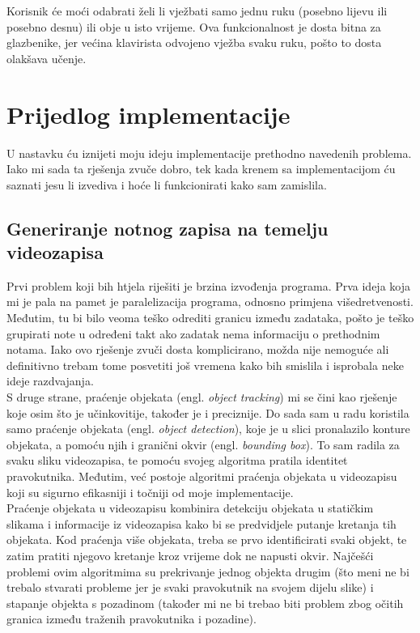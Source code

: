 \documentclass[times, utf8, seminar, numeric]{fer}
\begin{document}
Korisnik će moći odabrati želi li vježbati samo jednu ruku (posebno lijevu ili posebno desnu) ili obje u isto vrijeme. Ova funkcionalnost je dosta bitna za glazbenike, jer većina klavirista odvojeno vježba svaku ruku, pošto to dosta olakšava učenje.
 
\chapter{Prijedlog implementacije}
U nastavku ću iznijeti moju ideju implementacije prethodno navedenih problema. Iako mi sada ta rješenja zvuče dobro, tek kada krenem sa implementacijom ću saznati jesu li izvediva i hoće li funkcionirati kako sam zamislila.

\section{Generiranje notnog zapisa na temelju videozapisa}
Prvi problem koji bih htjela riješiti je brzina izvođenja programa. Prva ideja koja mi je pala na pamet je paralelizacija programa, odnosno primjena višedretvenosti. Međutim, tu bi bilo veoma teško odrediti granicu između zadataka, pošto je teško grupirati note u određeni takt ako zadatak nema informaciju o prethodnim notama. Iako ovo rješenje zvuči dosta komplicirano, možda nije nemoguće ali definitivno trebam tome posvetiti još vremena kako bih smislila i isprobala neke ideje razdvajanja.\\

S druge strane, praćenje objekata (engl. \textit{object tracking}\cite{tracking1}) mi se čini kao rješenje koje osim što je učinkovitije, također je i preciznije. Do sada sam u radu koristila samo praćenje objekata (engl. \textit{object detection}\cite{tracking2}), koje je u slici pronalazilo konture objekata, a pomoću njih i granični okvir (engl. \textit{bounding box}). To sam radila za svaku sliku videozapisa, te pomoću svojeg algoritma pratila identitet pravokutnika. Međutim, već postoje algoritmi praćenja objekata u videozapisu koji su sigurno efikasniji i točniji od moje implementacije\cite{tracking3}.\\

Praćenje objekata u videozapisu kombinira detekciju objekata u statičkim slikama i informacije iz videozapisa kako bi se predvidjele putanje kretanja tih objekata. Kod praćenja više objekata, treba se prvo identificirati svaki objekt, te zatim pratiti njegovo kretanje kroz vrijeme dok ne napusti okvir. Najčešći problemi ovim algoritmima su prekrivanje jednog objekta drugim (što meni ne bi trebalo stvarati probleme jer je svaki pravokutnik na svojem dijelu slike) i stapanje objekta s pozadinom (također mi ne bi trebao biti problem zbog očitih granica između traženih pravokutnika i pozadine).\\
\end{document}
